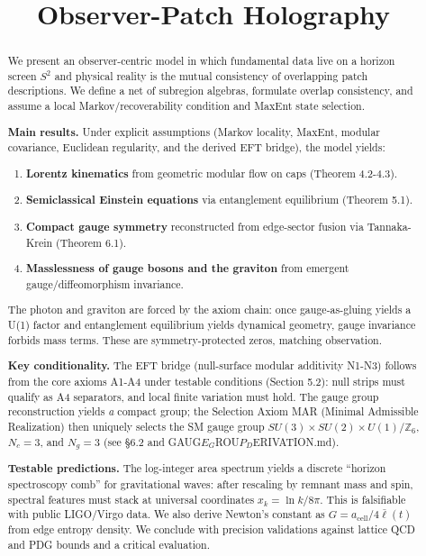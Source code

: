 \documentclass[11pt,a4paper]{article}
\title{Observer-Patch Holography}
\date{}
\theoremstyle{remark}
\providecommand{\tightlist}{%
  \setlength{\itemsep}{0pt}\setlength{\parskip}{0pt}}
\begin{document}
\maketitle

\begin{abstract}
We present an observer-centric model in which fundamental data live on a
horizon screen \(S^2\) and physical reality is the mutual consistency of
overlapping patch descriptions. We define a net of subregion algebras,
formulate overlap consistency, and assume a local Markov/recoverability
condition and MaxEnt state selection.

\textbf{Main results.} Under explicit assumptions (Markov locality, MaxEnt, modular
covariance, Euclidean regularity, and the derived EFT bridge), the model yields:

\begin{enumerate}
\def\labelenumi{\arabic{enumi}.}
\tightlist
\item
  \textbf{Lorentz kinematics} from geometric modular flow on caps (Theorem 4.2-4.3).
\item
  \textbf{Semiclassical Einstein equations} via entanglement equilibrium (Theorem 5.1).
\item
  \textbf{Compact gauge symmetry} reconstructed from edge-sector fusion via
  Tannaka-Krein (Theorem 6.1).
\item
  \textbf{Masslessness of gauge bosons and the graviton} from emergent
  gauge/diffeomorphism invariance.
\end{enumerate}

The photon and graviton are forced by the axiom chain: once gauge-as-gluing
yields a U(1) factor and entanglement equilibrium yields dynamical geometry,
gauge invariance forbids mass terms. These are symmetry-protected zeros,
matching observation.

\textbf{Key conditionality.} The EFT bridge (null-surface modular additivity N1-N3)
follows from the core axioms A1-A4 under testable conditions (Section
5.2): null strips must qualify as A4 separators, and local finite variation
must hold. The gauge group reconstruction yields \emph{a} compact group; the
Selection Axiom MAR (Minimal Admissible Realization) then uniquely selects
the SM gauge group \(SU(3) \times SU(2) \times U(1)/\mathbb{Z}_6\), \(N_c = 3\),
and \(N_g = 3\) (see §6.2 and GAUG$E_G$ROU$P_D$ERIVATION.md).

\textbf{Testable predictions.} The log-integer area spectrum yields a discrete
``horizon spectroscopy comb'' for gravitational waves: after rescaling by
remnant mass and spin, spectral features must stack at universal coordinates
\(x_k = \ln k / 8\pi\). This is falsifiable with public LIGO/Virgo data. We
also derive Newton's constant as \(G = a_\mathrm{cell}/4\bar{\ell}(t)\) from edge
entropy density. We conclude with precision
validations against lattice QCD and PDG bounds and a critical evaluation.


\end{abstract}
\end{document}
